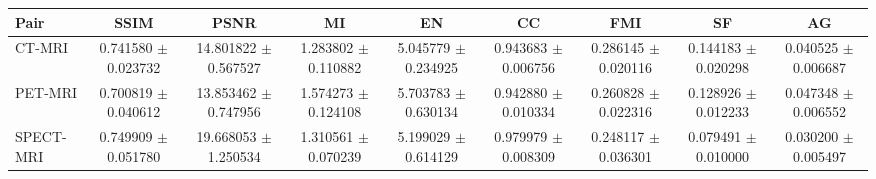 \begin{tabular}{lcccccccc}
\hline
Pair & SSIM & PSNR & MI & EN & CC & FMI & SF & AG \\
\hline
CT-MRI & 0.741580 $\pm$ 0.023732 & 14.801822 $\pm$ 0.567527 & 1.283802 $\pm$ 0.110882 & 5.045779 $\pm$ 0.234925 & 0.943683 $\pm$ 0.006756 & 0.286145 $\pm$ 0.020116 & 0.144183 $\pm$ 0.020298 & 0.040525 $\pm$ 0.006687 \\
PET-MRI & 0.700819 $\pm$ 0.040612 & 13.853462 $\pm$ 0.747956 & 1.574273 $\pm$ 0.124108 & 5.703783 $\pm$ 0.630134 & 0.942880 $\pm$ 0.010334 & 0.260828 $\pm$ 0.022316 & 0.128926 $\pm$ 0.012233 & 0.047348 $\pm$ 0.006552 \\
SPECT-MRI & 0.749909 $\pm$ 0.051780 & 19.668053 $\pm$ 1.250534 & 1.310561 $\pm$ 0.070239 & 5.199029 $\pm$ 0.614129 & 0.979979 $\pm$ 0.008309 & 0.248117 $\pm$ 0.036301 & 0.079491 $\pm$ 0.010000 & 0.030200 $\pm$ 0.005497 \\
\hline
\end{tabular}
